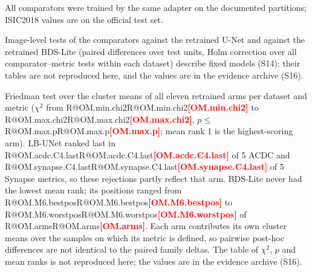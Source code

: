 \documentclass[10pt]{article}
\makeatletter
\newcommand{\R}[1]{\ifcsname R@#1\endcsname\csname R@#1\endcsname\else\textbf{\textcolor{red}{[#1]}}\fi}
\renewcommand\paragraph{\@startsection{paragraph}{4}{\z@}{1.6ex \@plus .5ex \@minus .2ex}{-1em}{\normalfont\normalsize\bfseries}}
\newcommand{\fitwidth}[1]{\sbox{\fitbox}{#1}\ifdim\wd\fitbox>\linewidth\resizebox{\linewidth}{!}{\usebox{\fitbox}}\else\usebox{\fitbox}\fi}
\makeatother
\begin{document}
All comparators were trained by the same adapter on the documented partitions; ISIC2018 values are on the official test set.
\begin{table}[!htbp]\centering
\fitwidth{}
\caption{Comparator and retrained-reference absolute means (seeds 1--3; mean $\pm$ sample SD of per-run image/slice class-macro scores, excluding classes absent in both masks). This is the aggregation used in Table~4 of the main text. Run-level contrasts separately use patient/case means and common defined test units; differences of these descriptive means need not equal those contrasts.}
\end{table}
Image-level tests of the comparators against the retrained U-Net and against the retrained BDS-Lite (paired differences over test units, Holm correction over all comparator--metric tests within each dataset) describe fixed models (S14); their tables are not reproduced here, and the values are in the evidence archive (S16).

\paragraph{Omnibus test.} Friedman test over the cluster means of all eleven retrained arms per dataset and metric ($\chi^2$ from \R{OM.min.chi2} to \R{OM.max.chi2}, $p\le$\,\R{OM.max.p}; mean rank 1 is the highest-scoring arm). LB-UNet ranked last in \R{OM.acdc.C4.last} of 5 ACDC and \R{OM.synapse.C4.last} of 5 Synapse metrics, so these rejections partly reflect that arm. BDS-Lite never had the lowest mean rank; its positions ranged from \R{OM.M6.bestpos} to \R{OM.M6.worstpos} of \R{OM.arms}. Each arm contributes its own cluster means over the samples on which its metric is defined, so pairwise post-hoc differences are not identical to the paired family deltas. The table of $\chi^2$, $p$ and mean ranks is not reproduced here; the values are in the evidence archive (S16).
\end{document}
